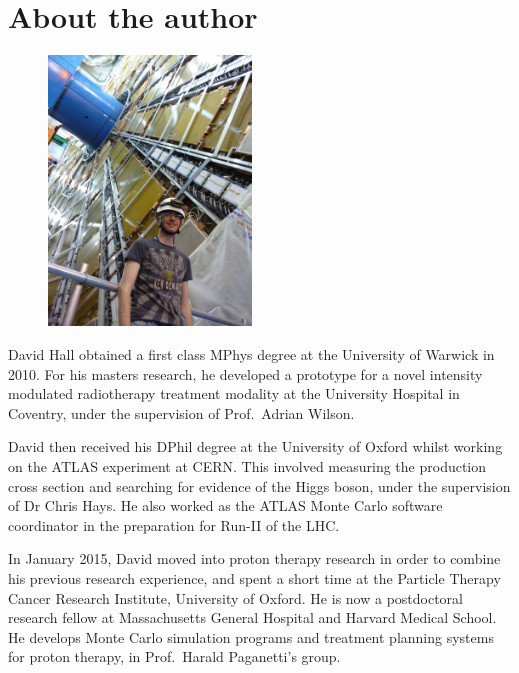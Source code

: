 
\section*{About the author}
\thispagestyle{plain}

\begin{figure}
	\vspace{-20pt}
	\centering
	\includegraphics[width=0.48\textwidth]{tex/david_photo}
	\vspace{-20pt}
\end{figure}

David Hall obtained a first class MPhys degree at the University of Warwick in 2010. For his 
masters research, he developed a prototype for a novel intensity modulated radiotherapy 
treatment modality at the University Hospital in Coventry, under the supervision of Prof.\ 
Adrian Wilson.

David then received his DPhil degree at the University of Oxford whilst working on the ATLAS 
experiment at CERN. This involved measuring the \WW production cross section and 
searching for evidence of the Higgs boson, under the supervision of Dr Chris Hays. He also 
worked as the ATLAS Monte Carlo software coordinator in the preparation for Run-II of the LHC.

In January 2015, David moved into proton therapy research in order to combine his previous 
research experience, and spent a short time at the Particle Therapy Cancer Research 
Institute, University of Oxford. He is now a postdoctoral research fellow at Massachusetts 
General Hospital and Harvard Medical School. He develops Monte Carlo simulation programs and 
treatment planning systems for proton therapy, in Prof.\ Harald Paganetti's group.

\nocite{HWW-RunI-submit,ATLAS:combination:2013,YR3,ATLAS-discovery,WW-7TeV,WW-1ifb,VersatileLinkConnectors,VersatileLinkFibres,VersatileLink}

\let\oldbibname\bibname
\renewcommand{\bibname}{Selected publications}


\let\bibname\oldbibname
